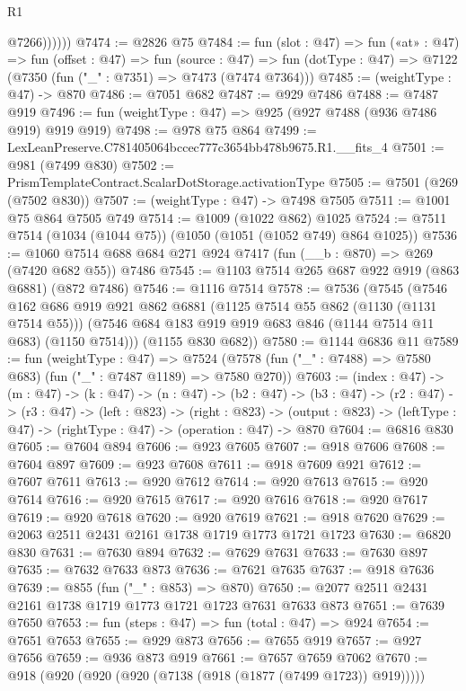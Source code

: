\begin{lexlean}{R1}
\begin{coremodule}
                @7266))))))
@7474 := @2826 @75
@7484 := fun (slot : @47) =>
  fun («at» : @47) =>
  fun (offset : @47) =>
  fun (source : @47) =>
  fun (dotType : @47) => @7122 (@7350 (fun ("_" : @7351) => @7473 (@7474 @7364)))
@7485 := (weightType : @47) -> @870
@7486 := @7051 @682
@7487 := @929 @7486
@7488 := @7487 @919
@7496 := fun (weightType : @47) => @925 (@927 @7488 (@936 @7486 @919) @919 @919)
@7498 := @978 @75 @864
@7499 := LexLeanPreserve.C781405064bccec777c3654bb478b9675.R1.__fits_4
@7501 := @981 (@7499 @830)
@7502 := PrismTemplateContract.ScalarDotStorage.activationType
@7505 := @7501 (@269 (@7502 @830))
@7507 := (weightType : @47) -> @7498 @7505
@7511 := @1001 @75 @864 @7505 @749
@7514 := @1009 (@1022 @862) @1025
@7524 := @7511 @7514 (@1034 (@1044 @75)) (@1050 (@1051 (@1052 @749) @864 @1025))
@7536 := @1060 @7514 @688 @684 @271 @924 @7417 (fun (__b : @870) => @269 (@7420 @682 @55)) @7486
@7545 := @1103 @7514 @265 @687 @922 @919 (@863 @6881) (@872 @7486)
@7546 := @1116 @7514
@7578 := @7536
    (@7545
      (@7546
        @162
        @686
        @919
        @921
        @862
        @6881
        (@1125 @7514 @55 @862 (@1130 (@1131 @7514 @55)))
        (@7546 @684 @183 @919 @919 @683 @846 (@1144 @7514 @11 @683) (@1150 @7514)))
      (@1155 @830 @682))
@7580 := @1144 @6836 @11
@7589 := fun (weightType : @47) =>
  @7524 (@7578 (fun ("_" : @7488) => @7580 @683) (fun ("_" : @7487 @1189) => @7580 @270))
@7603 := (index : @47) ->
  (m : @47) ->
  (k : @47) ->
  (n : @47) ->
  (b2 : @47) ->
  (b3 : @47) ->
  (r2 : @47) ->
  (r3 : @47) ->
  (left : @823) ->
  (right : @823) ->
  (output : @823) -> (leftType : @47) -> (rightType : @47) -> (operation : @47) -> @870
@7604 := @6816 @830
@7605 := @7604 @894
@7606 := @923 @7605
@7607 := @918 @7606
@7608 := @7604 @897
@7609 := @923 @7608
@7611 := @918 @7609 @921
@7612 := @7607 @7611
@7613 := @920 @7612
@7614 := @920 @7613
@7615 := @920 @7614
@7616 := @920 @7615
@7617 := @920 @7616
@7618 := @920 @7617
@7619 := @920 @7618
@7620 := @920 @7619
@7621 := @918 @7620
@7629 := @2063 @2511 @2431 @2161 @1738 @1719 @1773 @1721 @1723
@7630 := @6820 @830
@7631 := @7630 @894
@7632 := @7629 @7631
@7633 := @7630 @897
@7635 := @7632 @7633 @873
@7636 := @7621 @7635
@7637 := @918 @7636
@7639 := @855 (fun ("_" : @853) => @870)
@7650 := @2077 @2511 @2431 @2161 @1738 @1719 @1773 @1721 @1723 @7631 @7633 @873
@7651 := @7639 @7650
@7653 := fun (steps : @47) => fun (total : @47) => @924
@7654 := @7651 @7653
@7655 := @929 @873
@7656 := @7655 @919
@7657 := @927 @7656
@7659 := @936 @873 @919
@7661 := @7657 @7659 @7062
@7670 := @918 (@920 (@920 (@920 (@7138 (@918 (@1877 (@7499 @1723)) @919)))))

\end{coremodule}
\end{lexlean}
